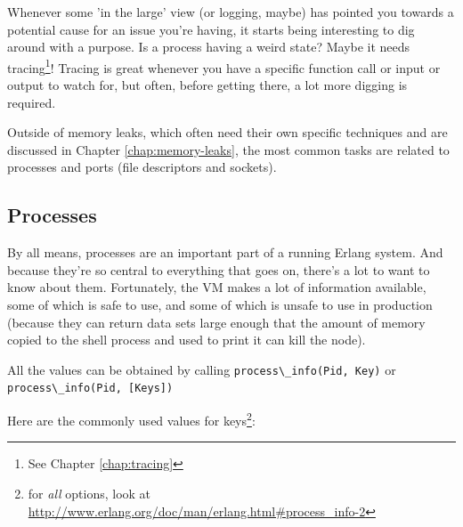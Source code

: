 \documentclass[11pt, oneside]{book}   	%
\newcommand{\expression}[1]{\Verb`#1`}
\begin{document}
Whenever some 'in the large' view (or logging, maybe) has pointed you towards a potential cause for an issue you're having, it starts being interesting to dig around with a purpose. Is a process having a weird state? Maybe it needs tracing\footnote{See Chapter \ref{chap:tracing}}! Tracing is great whenever you have a specific function call or input or output to watch for, but often, before getting there, a lot more digging is required.

Outside of memory leaks, which often need their own specific techniques and are discussed in Chapter \ref{chap:memory-leaks}, the most common tasks are related to processes and ports (file descriptors and sockets).

\subsection{Processes}
\label{subsec:digging-procs}

By all means, processes are an important part of a running Erlang system. And because they're so central to everything that goes on, there's a lot to want to know about them. Fortunately, the VM makes a lot of information available, some of which is safe to use, and some of which is unsafe to use in production (because they can return data sets large enough that the amount of memory copied to the shell process and used to print it can kill the node).

All the values can be obtained by calling \expression{process\_info(Pid, Key)} or \expression{process\_info(Pid, [Keys])}

Here are the commonly used values for keys\footnote{for \emph{all} options, look at \href{http://www.erlang.org/doc/man/erlang.html\#process\_info-2}{http://www.erlang.org/doc/man/erlang.html\#process\_info-2}}:
\end{document}
